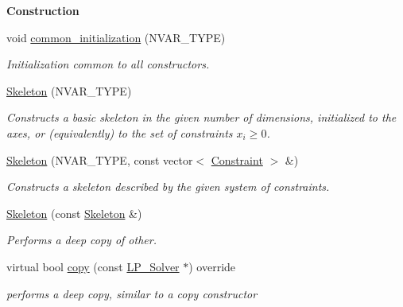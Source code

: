\begin{Indent}\textbf{ Construction}\par
\begin{DoxyCompactItemize}
\item 
\mbox{\label{group___c_l_s_solvers_aa63d9454338c84be898e1a604eba3527}} 
void \hyperlink{group___c_l_s_solvers_aa63d9454338c84be898e1a604eba3527}{common\+\_\+initialization} (N\+V\+A\+R\+\_\+\+T\+Y\+PE)
\begin{DoxyCompactList}\small\item\em Initialization common to all constructors. \end{DoxyCompactList}\item 
\hyperlink{group___c_l_s_solvers_ad9f2f64c49dbf96ebd30852e670e7642}{Skeleton} (N\+V\+A\+R\+\_\+\+T\+Y\+PE)
\begin{DoxyCompactList}\small\item\em Constructs a basic skeleton in the given number of dimensions, initialized to the axes, or (equivalently) to the set of constraints $ x_i \geq 0 $. \end{DoxyCompactList}\item 
\hyperlink{group___c_l_s_solvers_ad61d70c2397e93141de3ad3c987b1828}{Skeleton} (N\+V\+A\+R\+\_\+\+T\+Y\+PE, const vector$<$ \hyperlink{group___c_l_s_solvers_class_l_p___solvers_1_1_constraint}{Constraint} $>$ \&)
\begin{DoxyCompactList}\small\item\em Constructs a skeleton described by the given system of constraints. \end{DoxyCompactList}\item 
\mbox{\label{group___c_l_s_solvers_a4f9ed09dbe0b7fe8bc9972ce5488eb48}} 
\hyperlink{group___c_l_s_solvers_a4f9ed09dbe0b7fe8bc9972ce5488eb48}{Skeleton} (const \hyperlink{group___c_l_s_solvers_class_l_p___solvers_1_1_skeleton}{Skeleton} \&)
\begin{DoxyCompactList}\small\item\em Performs a deep copy of {\ttfamily other}. \end{DoxyCompactList}\item 
virtual bool \hyperlink{group___c_l_s_solvers_a242f1dc35468e2326e6f7c10bc0d0fd4}{copy} (const \hyperlink{group___c_l_s_solvers_class_l_p___solvers_1_1_l_p___solver}{L\+P\+\_\+\+Solver} $\ast$) override
\begin{DoxyCompactList}\small\item\em performs a deep copy, similar to a copy constructor \end{DoxyCompactList}\end{DoxyCompactItemize}
\end{Indent}

